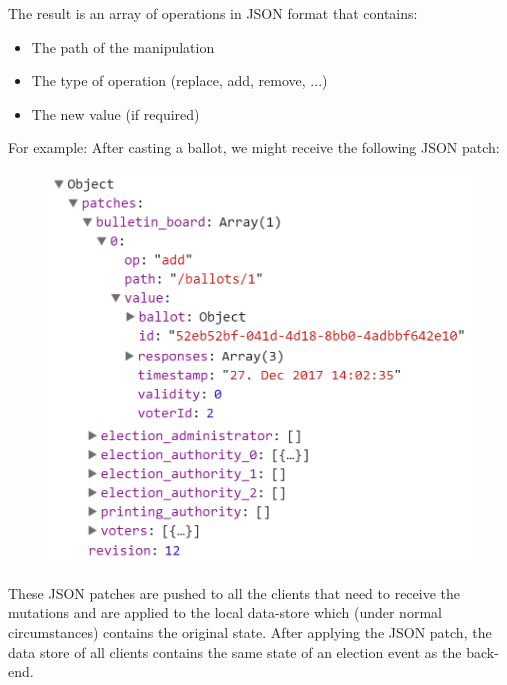 The result is an array of operations in JSON format that contains:
\begin{itemize}
	\item The path of the manipulation
	\item The type of operation (replace, add, remove, ...)
	\item The new value (if required)
\end{itemize}

For example: After casting a ballot, we might receive the following JSON patch:

\begin{figure}
\begin{center}
\includegraphics[scale=0.6]{assets/jsonpatchexample.png}
\label{JSON Patch example}%
\end{center}
\end{figure}
These JSON patches are pushed to all the clients that need to receive the mutations and are applied to the local data-store which (under normal circumstances) contains the original state. After applying the JSON patch, the data store of all clients contains the same state of an election event as the back-end.

